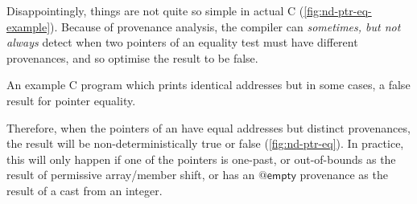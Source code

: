 Disappointingly, things are not quite so simple in actual C
(\cref{fig:nd-ptr-eq-example}). Because of provenance analysis, the compiler can
\emph{sometimes, but not always} detect when two pointers of an
equality test must have different provenances, and so optimise the result to be
false.

\begin{marginfigure}
    \caption{An example C program which prints identical addresses but
        in some cases, a false result for pointer equality.}\label{fig:nd-ptr-eq-example}
\end{marginfigure}

Therefore, when the pointers of an \cinline{==} have equal
addresses but distinct provenances, the result will be
non-deterministically true or false (\cref{fig:nd-ptr-eq}). In practice, this will
only happen if one of the pointers is one-past, or out-of-bounds as
the result of permissive array/member shift, or has an $@\mathsf{empty}$
provenance as the result of a cast from an integer.

